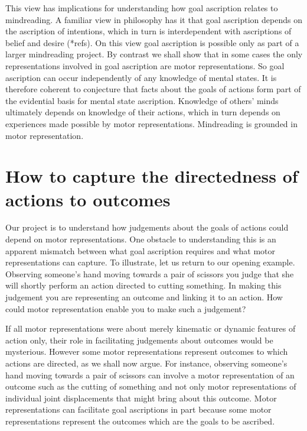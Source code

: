 \documentclass[12pt,\papersize]{extarticle}
\begin{document}
This view has implications for understanding how goal ascription relates to mindreading. A familiar view in philosophy has it that goal ascription depends on the ascription of intentions, which in turn is interdependent with ascriptions of belief and desire (*refs). On this view goal ascription is possible only as part of a larger mindreading project. By contrast we shall show that in some cases the only representations involved in goal ascription are motor representations. So goal ascription can occur independently of any knowledge of mental states. It is therefore coherent to conjecture that facts about the goals of actions form part of the evidential basis for mental state ascription. Knowledge of others' minds ultimately depends on knowledge of their actions, which in turn depends on experiences made possible by motor representations.  Mindreading is grounded in motor representation.


\section{How to capture the directedness of actions to outcomes}

Our project is to understand how judgements about the goals of actions  could depend on motor representations.  One obstacle to understanding this is an apparent mismatch between what goal ascription requires and what motor representations can capture. To illustrate, let us return to our opening example. Observing someone's hand moving towards a pair of scissors you judge that she will shortly perform an action directed to cutting something.  In making this judgement you are representing an outcome and linking it to an action. How could motor representation enable you to make such a judgement?

If all motor representations were about merely kinematic or dynamic features of action only, their role in facilitating judgements about outcomes would be mysterious. However some motor representations represent outcomes to which actions are directed, as we shall now argue.  For instance, observing someone's hand moving towards a pair of scissors can involve a motor representation of an outcome such as the cutting of something and not only motor representations of individual joint displacements that might bring about this outcome.  Motor representations can facilitate goal ascriptions in part because some motor representations represent the outcomes which are the goals to be ascribed.  
\end{document}
